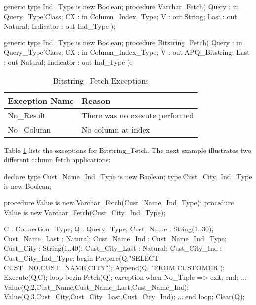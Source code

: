 \documentclass[english,letterpaper]{book}
\begin{document}
\begin{Code}
generic
   type Ind_Type is new Boolean;
procedure Varchar_Fetch(
   Query :     in     Query_Type'Class;
   CX :        in     Column_Index_Type;
   V :            out String;
   Last :         out Natural;
   Indicator :    out Ind_Type
);
\end{Code}

\begin{Code}
generic
   type Ind_Type is new Boolean;
procedure Bitstring_Fetch(
   Query :     in     Query_Type'Class;
   CX :        in     Column_Index_Type;
   V :            out APQ_Bitstring;
   Last :         out Natural;
   Indicator :    out Ind_Type
);
\end{Code}

\begin{table}
   \begin{center}
      \begin{tabular}{ll}
         Exception Name    &  Reason\\
         \hline 
         No\_Result        &  There was no execute performed\\
         No\_Column        &  No column at index\\
      \end{tabular}
   \end{center}
   \caption{Bitstring\_Fetch Exceptions}\label{t:bfx}
\end{table}

Table \ref{t:bfx} lists the exceptions for Bitstring\_Fetch.
The next example illustrates two different column fetch applications:

\begin{Example}
declare
   type Cust_Name_Ind_Type is new Boolean;
   type Cust_City_Ind_Type is new Boolean;

   procedure Value is new 
      Varchar_Fetch(Cust_Name_Ind_Type);
   procedure Value is new 
      Varchar_Fetch(Cust_City_Ind_Type);

   C :              Connection_Type;
   Q :              Query_Type;
   Cust_Name :      String(1..30);
   Cust_Name_Last : Natural;
   Cust_Name_Ind :  Cust_Name_Ind_Type;
   Cust_City :      String(1..40);
   Cust_City_Last : Natural;
   Cust_City_Ind :  Cust_City_Ind_Type;
begin
   Prepare(Q,"SELECT CUST_NO,CUST_NAME,CITY");
   Append(Q, "FROM CUSTOMER");
   Execute(Q,C);
   loop
      begin
         Fetch(Q);
      exception
         when No_Tuple =>
            exit;
      end;
      ...
      Value(Q,2,Cust_Name,Cust_Name_Last,Cust_Name_Ind);
      Value(Q,3,Cust_City,Cust_City_Last,Cust_City_Ind);
      ...
   end loop;
   Clear(Q);
\end{Example}
\end{document}
